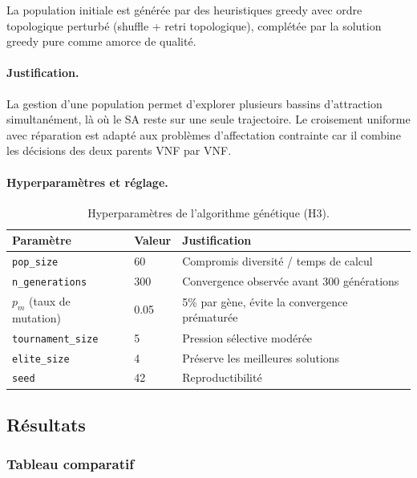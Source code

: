 \documentclass{article}
\begin{document}
La population initiale est générée par des heuristiques greedy avec ordre
topologique perturbé (shuffle + retri topologique), complétée par la solution
greedy pure comme amorce de qualité.

\paragraph{Justification.}
La gestion d'une population permet d'explorer plusieurs bassins d'attraction
simultanément, là où le SA reste sur une seule trajectoire. Le croisement uniforme
avec réparation est adapté aux problèmes d'affectation contrainte car il combine
les décisions des deux parents VNF par VNF.

\paragraph{Hyperparamètres et réglage.}

\begin{table}[h!]
\centering
\begin{tabular}{lll}
\toprule
\textbf{Paramètre} & \textbf{Valeur} & \textbf{Justification} \\
\midrule
\texttt{pop\_size}        & 60  & Compromis diversité / temps de calcul \\
\texttt{n\_generations}   & 300 & Convergence observée avant 300 générations \\
$p_m$ (taux de mutation)  & 0.05 & 5\% par gène, évite la convergence prématurée \\
\texttt{tournament\_size} & 5   & Pression sélective modérée \\
\texttt{elite\_size}      & 4   & Préserve les meilleures solutions \\
\texttt{seed}             & 42  & Reproductibilité \\
\bottomrule
\end{tabular}
\caption{Hyperparamètres de l'algorithme génétique (H3).}
\end{table}

\subsection{Résultats}

\subsubsection{Tableau comparatif}
\end{document}
